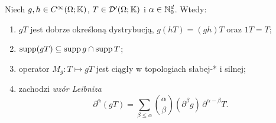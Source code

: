 \begin{twierdzenie}
\label{thm:multiply20}
Niech $g,h\in C^\infty(\Omega;\mathbb K)$, $T\in\mathcal D'(\Omega;\mathbb K)$
i $\alpha\in\mathbb N_0^d$. Wtedy:
\begin{enumerate}
\item $gT$ jest dobrze określoną dystrybucją,
$g(hT)=(gh)T$ oraz $1T=T$;
\item $\operatorname{supp}(gT)\subseteq\operatorname{supp} g\cap\operatorname{supp} T$;
\item operator $M_g:T\mapsto gT$ jest ciągły w topologiach
słabej-* i silnej;
\item zachodzi \emph{wzór Leibniza}
\[
 \partial^\alpha(gT)=
 \sum_{\beta\le\alpha}\binom\alpha\beta
 (\partial^\beta g)\,\partial^{\alpha-\beta}T.
\]
\end{enumerate}
\end{twierdzenie}

